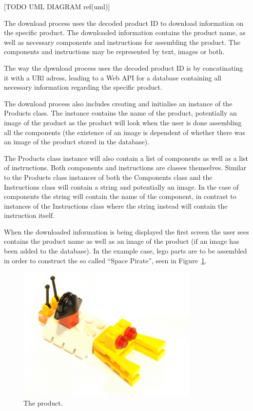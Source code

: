 [TODO UML DIAGRAM ref(uml)]




The download process uses the decoded product ID to download information on the specific product. The downloaded information contains the product name, as well as necessary components and instructions for assembling the product. The components and instructions may be represented by text, images or both. 

The way the dpwnload process uses the decoded product ID is by concatinating it with a URl adress, leading to a Web API for a database containing all necessary information regarding the specific product.

The download process also includes creating and initialise an instance of the Products class. The instance contains the name of the product, potentially an image of the product as the product will look when the user is done assembling all the components (the existence of an image is dependent of whether there was an image of the product stored in the database).

The Products class instance will also contain a list of components as well as a list of instructions. Both components and instructions are classes themselves. Similar to the Products class instances of both the Components class and the Instructions class will contain a string and potentially an image. In the case of components the string will contain the name of the component, in contrast to instances of the Instructions class where the string instead will contain the instruction itself.

When the downloaded information is being displayed the first screen the user sees contains the product name as well as an image of the product (if an image has been added to the database). In the example case, lego parts are to be assembled in order to construct the so called ``Space Pirate'', seen in Figure~\ref{glassDemoRaw}.

	\begin{figure}[H]%
		\centering
		\includegraphics[width=90mm]{images/rawImages/BILD_6}
		\caption{The product.}
		\label{glassDemoRaw}
	\end{figure}


